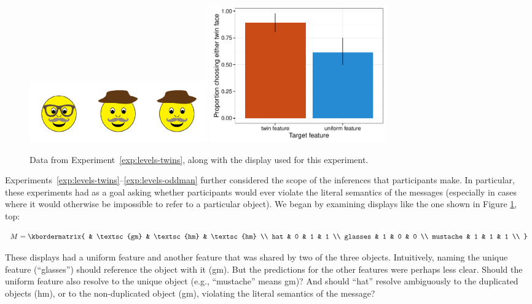 \documentclass[man]{apa6}
\newcounter{Experiment}
\newcommand{\exptref}[1]{Experiment~\ref{#1}}
\newcommand{\exptrefrange}[2]{Experiments~\ref{#1}--\ref{#2}}
\begin{document}
 \begin{figure}[t]
  \centering
  \includegraphics[width=3in]{figures/levels-twins-stim.pdf}
  \includegraphics[width=3in]{../plots/3-levels-twins.pdf}
  \caption{\label{fig:levels-twins} Data from \exptref{exp:levels-twins}, along with the display used for this experiment.}
\end{figure}

\exptrefrange{exp:levels-twins}{exp:levels-oddman} further considered the scope of the inferences that participants make. In particular, these experiments had as a goal asking whether participants would ever violate the literal semantics of the messages (especially in cases where it would otherwise be impossible to refer to a particular object). We began by examining displays like the one shown in Figure \ref{fig:levels-twins}, top:

\begin{equation}
    M = \kbordermatrix{
               & \textsc{gm} & \textsc{hm} & \textsc{hm} \\
      hat      & 0  & 1  & 1  \\
      glasses  & 1  & 0  & 0 \\
      mustache & 1  & 1  & 1 \\
    }
\end{equation}

\noindent These displays had a uniform feature and another feature that was shared by two of the three objects. Intuitively, naming the unique feature (``glasses'') should reference the object with it ({\sc gm}). But the predictions for the other features were perhaps less clear. Should the uniform feature also resolve to the unique object (e.g., ``mustache'' means {\sc gm})? And should ``hat'' resolve ambiguously to the duplicated objects ({\sc hm}), or to the non-duplicated object ({\sc gm}), violating the literal semantics of the message?
\end{document}
